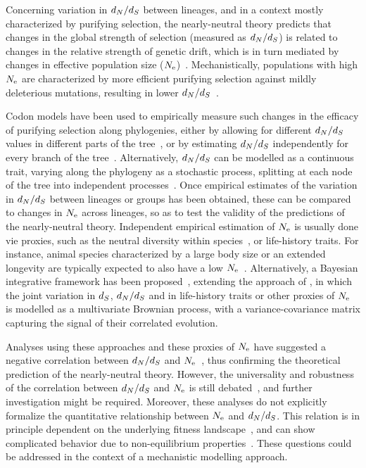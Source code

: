 \documentclass{article}
\begin{document}
    Concerning variation in $d_N / d_S$ between lineages, and in a context mostly characterized by purifying selection, the {nearly-neutral} theory predicts that changes in the global strength of selection (measured as $d_N / d_S$) is related to changes in the relative strength of {genetic drift}, which is in turn mediated by changes in {effective population size} ($N_{\text{e}}$)~\citep{Ohta1992}.
    Mechanistically, populations with high $N_{\text{e}}$ are characterized by more efficient purifying selection against mildly deleterious mutations, resulting in lower $d_N / d_S$~\citep{Kimura1979, Welch2008}.

    Codon models have been used to empirically measure such changes in the efficacy of purifying selection along phylogenies, either by allowing for different $d_N / d_S$ values in different parts of the tree~\citep{Dutheil2012}, or by estimating $d_N / d_S$ independently for every branch of the tree~\citep{Popadin2007}.
    Alternatively, $d_N / d_S$ can be modelled as a continuous trait, varying along the phylogeny as a stochastic process, splitting at each node of the tree into independent processes~\citep{Seo2004}.
    Once empirical estimates of the variation in $d_N / d_S$ between lineages or groups has been obtained, these can be compared to changes in $N_{\text{e}}$ across lineages, so as to test the validity of the predictions of the {nearly-neutral} theory.
    Independent empirical estimation of $N_{\text{e}}$ is usually done vie proxies, such as the {neutral} diversity within species~\citep{Galtier2016}, or life-history traits.
    For instance, animal species characterized by a large body size or an extended longevity are typically expected to also have a low $N_{\text{e}}$~\citep{Romiguier2014}.
    Alternatively, a Bayesian integrative framework has been proposed~\citep{Lartillot2011}, extending the approach of \citet{Seo2004}, in which the joint variation in $d_S$, $d_N / d_S$ and in life-history traits or other proxies of $N_{\text{e}}$ is modelled as a multivariate Brownian process, with a variance-covariance matrix capturing the signal of their correlated evolution.

    Analyses using these approaches and these proxies of $N_{\text{e}}$ have suggested a negative correlation between $d_N / d_S$ and $N_{\text{e}}$~\citep{Popadin2007, Lanfear2010, Lartillot2011, Lartillot2012, Romiguier2014, Figuet2017}, thus confirming the theoretical prediction of the {nearly-neutral} theory.
    However, the universality and robustness of the correlation between $d_N / d_S$ and $N_{\text{e}}$ is still debated~\citep{Nabholz2013,Lanfear2014,Figuet2016, Bolivar2019}, and further investigation might be required.
    Moreover, these analyses do not explicitly formalize the quantitative relationship between $N_{\text{e}}$ and $d_N / d_S$.
    This relation is in principle dependent on the underlying fitness landscape~\citep{Welch2008, Cherry1998, Goldstein2011}, and can show complicated behavior due to non-equilibrium properties~\citep{Jones2016}.
    These questions could be addressed in the context of a mechanistic modelling approach.
\end{document}
